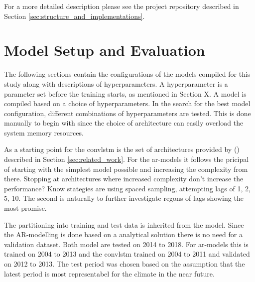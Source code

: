 For a more detailed description please see the project repository described in Section \ref{sec:structure_and_implementations}.

\section{Model Setup and Evaluation}
The following sections contain the configurations of the models compiled for this study along with descriptions of hyperparameters. A hyperparameter is a parameter set before the training starts, as mentioned in Section X. A model is compiled based on a choice of hyperparameters. In the search for the best model configuration, different combinations of hyperparameters are tested. This is done manually to begin with since the choice of architecture can easily overload the system memory resources.

As a starting point for the \acrshort{convlstm} is the set of architectures provided by \citeauthor{SunAirLSTM} (\citeyear{SunAirLSTM}) described in Section \ref{sec:related_work}. For the \acrshort{ar}-models it follows the pricipal of starting with the simplest model possible and increasing the complexity from there. Stopping at architectures where increased complexity don't increase the performance? Know stategies are using spaced sampling, attempting lags of 1, 2, 5, 10. The second is naturally to further investigate regons of lags showing the most promise. 

The partitioning into training and test data is inherited from the model. Since the AR-modelling is done based on a analytical solution there is no need for a validation dataset. Both model are tested on 2014 to 2018. For \acrshort{ar}-models this is trained on 2004 to 2013 and the \acrshort{convlstm} trained on  2004 to 2011 and validated on  2012 to 2013. The test period was chosen based on the assumption that the latest period is most representabel for the climate in the near future.

